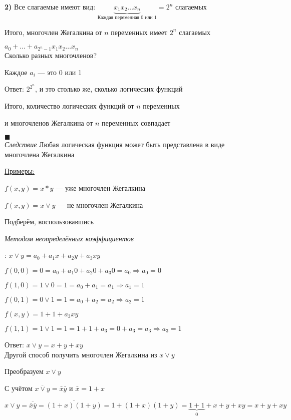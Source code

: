 \documentclass[a4paper, 12pt] {article}
\begin{document}
\textbf{2)} Все слагаемые имеют вид: $ \underbrace{x_{1}x_{2}\dots x_{n}}_{\text{Каждая переменная 0 или 1}} = 2^{n} $ слагаемых

Итого, многочлен Жегалкина от $ n $ переменных имеет $ 2^{n} $ слагаемых

$ a_{0}+\dots+a_{2^{n}-1}x_{1}x_{2}\dots x_{n} $\\

Сколько разных многочленов?

Каждое $ a_{i} $ --- это 0 или 1

Ответ: $ 2^{2^{n}} $, и это столько же, сколько логических функций

Итого, количество логических функций от $ n $ переменных

 и многочленов Жегалкина от $ n $ переменных совпадает

$ \blacksquare $\\

\textit{Следствие} Любая логическая функция может быть представлена в виде многочлена Жегалкина

\newpage
\underline{Примеры:}

$ f(x, y) = x * y $ --- уже многочлен Жегалкина

$ f(x, y) = x \vee y $ --- не многочлен Жегалкина

Подберём, воспользовавшись 

\hypertarget{a1}{\textit{Методом неопределённых коэффициентов}}: $ x \vee y = a_{0} +a_{1}x+a_{2}y +a_{3}xy $

$ f(0, 0) = 0=a_{0} +a_{1}0+a_{2}0 +a_{3}0=a_{0} \Rightarrow a_{0}=0 $

$ f(1, 0) = 1 \vee 0=1=a_{0} +a_{1}=a_{1} \Rightarrow a_{1}=1 $

$ f(0, 1) = 0 \vee 1=1=a_{0} +a_{2}=a_{2} \Rightarrow a_{2}=1 $

$  f(x, y)=1+1 +a_{3}xy$

$ f(1, 1) = 1 \vee 1=1=1+1 +a_{3}=0+a_{3}=a_{3} \Rightarrow a_{3}=1 $

Ответ: $ x \vee y = x+y +xy $\\

Другой способ получить многочлен Жегалкина из $ x \vee y $

Преобразуем $ x \vee y $

С учётом $ \overline{x \vee y} = \bar x \bar y $ и $ \bar x = 1+x $

$ x \vee y = \overline{ \bar x \bar y } = \overline{(1+x)(1+y)}=1+(1+x)(1+y)=\underbrace{1+1}_0+x+y+xy=x+y+xy$\\
\end{document}
